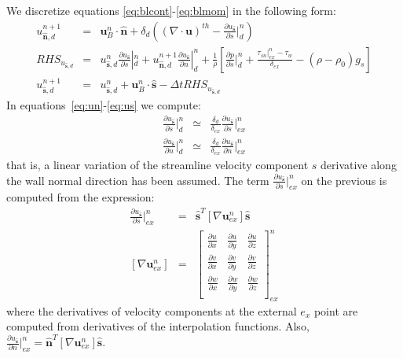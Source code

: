 \documentclass[12pt]{article}
\begin{document}
We discretize equations \eqref{eq:blcont}-\eqref{eq:blmom} in the following form:
%
\begin{eqnarray}
   u_{\hat{\mathbf{n}},d}^{n+1} &=& \mathbf{u}_{B}^n \cdot \hat{\mathbf{n}} + \delta_d \left(  \left( \nabla \cdot \mathbf{u} \right)^{th}
   - \frac{\partial u_{\hat{\mathbf{s}}} }{\partial s} |_{d}^n \right) \label{eq:un} \\
   RHS_{u_{\hat{\mathbf{s}},d}} &=&  u_{\hat{\mathbf{s}},d}^n  \frac{\partial u_{\hat{\mathbf{s}}} }{\partial s} |_{d}^n  +
   u_{\hat{\mathbf{n}},d}^{n+1} \frac{\partial u_{\hat{\mathbf{s}}} }{\partial n} |_{d}^n +
   \frac{1}{\rho} \left[  \frac{\partial p}{\partial s} |_d^n + \frac{\tau_{sn} |_{ex}^n - \tau_w}{\delta_{ex}} - (\rho-\rho_0) g_s \right] \label{eq:rhsus} \\
   u_{\hat{\mathbf{s}},d}^{n+1} &=& u_{\hat{\mathbf{s}},d}^{n}+\mathbf{u}_{B}^n \cdot \hat{\mathbf{s}} - \Delta t RHS_{u_{\hat{\mathbf{s}},d}} \label{eq:us}
\end{eqnarray}
%
In equations~\eqref{eq:un}-\eqref{eq:us} we compute:
%
\begin{eqnarray}
   \frac{\partial u_{\hat{\mathbf{s}}} }{\partial s} |_{d}^n &\simeq& \frac{ \delta_d}{ \delta_{ex}} \frac{\partial u_{\hat{\mathbf{s}}} }{\partial s} |_{ex}^n \\
    \frac{\partial u_{\hat{\mathbf{s}}} }{\partial n} |_{d}^n &\simeq& \frac{ \delta_d}{ \delta_{ex}} \frac{\partial u_{\hat{\mathbf{s}}} }{\partial n} |_{ex}^n
\end{eqnarray}
%
that is, a linear variation of the streamline velocity component $s$ derivative along the wall normal direction has been assumed.
The term $\frac{\partial u_{\hat{\mathbf{s}}} }{\partial s} |_{ex}^n$ on the previous is computed from the expression:
%
\begin{eqnarray}
   \frac{\partial u_{\hat{\mathbf{s}}} }{\partial s} |_{ex}^n &=& \hat{\mathbf{s}}^T \left[ \nabla \mathbf{u}_{ex}^n \right]  \hat{\mathbf{s}} \\
   \left[ \nabla \mathbf{u}_{ex}^n \right] &=& \begin{bmatrix}
   \frac{\partial u}{\partial x} & \frac{\partial u}{\partial y} & \frac{\partial u}{\partial z} \\
   \frac{\partial v}{\partial x} & \frac{\partial v}{\partial y} & \frac{\partial v}{\partial z} \\
   \frac{\partial w}{\partial x} & \frac{\partial w}{\partial y} & \frac{\partial w}{\partial z} \\
   \end{bmatrix}_{ex}^n
\end{eqnarray}
%
where the derivatives of velocity components at the external $e_x$ point are computed from derivatives of the interpolation functions. Also,  $\frac{\partial u_{\hat{\mathbf{s}}} }{\partial n} |_{ex}^n=\hat{\mathbf{n}}^T \left[ \nabla \mathbf{u}_{ex}^n \right]  \hat{\mathbf{s}}$.
\end{document}
